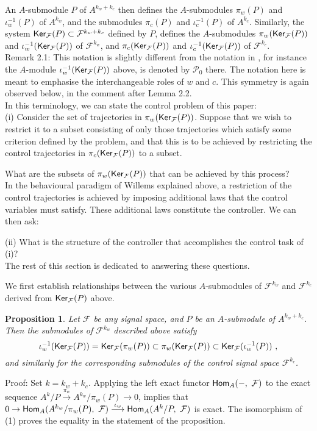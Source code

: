 \documentclass[11pt]{amsart}
\newtheorem{proposition}{Proposition}[section]
\def\homo{\mathop{\sf Hom}}
\def\ker{\mathop{\sf Ker}}
\newcommand{\F}{\mathcal{F}}
\begin{document}
{An $A$-submodule $P$ of $A^{k_w+k_c}$ then defines the $A$-submodules $\pi_w(P)$ and $\iota^{-1}_w(P)$ of $A^{k_w}$, and the submodules $\pi_c(P)$ and $\iota^{-1}_c(P)$ of $A^{k_c}$. Similarly, the system $\ker_\F(P) \subset \F^{k_w+k_c}$ defined by $P$, defines the $A$-submodules $\pi_w(\ker_\F(P))$ and $\iota^{-1}_w(\ker_\F(P))$ of $\F^{k_w}$, and $\pi_c(\ker_\F(P))$ and $\iota^{-1}_c(\ker_\F(P))$ of $\F^{k_c}$. \\

\noindent Remark 2.1: This notation is slightly different from the notation in \cite{sc}, for instance the $A$-module $\iota^{-1}_w(\ker_\F(P))$ above, is denoted by $\mathcal{P}_0$ there. The notation here is meant to emphasise the interchangeable roles of $w$ and $c$. This symmetry is again observed below, in the comment after Lemma 2.2.\\


In this terminology, we can state the control problem of this paper: \\
(i) Consider the set of trajectories in $\pi_w(\ker_\F(P))$. Suppose that we wish to restrict it to a subset consisting of only those trajectories which satisfy some criterion defined by the problem, and that this is to be achieved by restricting the control trajectories in $\pi_c(\ker_\F(P))$ to a subset.

\vspace{1.5mm}
What are the subsets of $\pi_w(\ker_\F(P))$ that can be achieved by this process? \\

In the behavioural paradigm of Willems explained above, a restriction of the control trajectories is  achieved by imposing additional laws that the control variables must satisfy. These additional laws constitute the controller. We can then ask:
\vspace{1.5mm}

(ii) What is the structure of the controller that accomplishes the control task of (i)? \\

The rest of this section is dedicated to answering these questions. 
\vspace{1.5mm}

We first establish relationships between the various $A$-submodules of $\F^{k_w}$ and $\F^{k_c}$ derived from $\ker_\F(P)$ above.

\begin{proposition} Let $\F$ be any signal space, and $P$ be an $A$-submodule of  $A^{k_w+k_c}$. Then the submodules of $\F^{k_w}$ described above satisfy
\[ 
\iota_w^{-1}({\ker}_\F(P)) = {\ker}_\F(\pi_w(P)) \subset \pi_w({\ker}_\F(P)) \subset {\ker}_\F(\iota_w^{-1}(P)) ~, \] 
and similarly for the corresponding submodules of the control signal space $\F^{k_c}$.
\end{proposition}
\noindent Proof: Set $k = k_w + k_c$. Applying the left exact functor $\homo_A( -, ~\F)$ to the exact sequence $A^k/P \stackrel{\pi_w}{\longrightarrow} A^{k_w}/\pi_w(P) \rightarrow 0$, implies that   $0 \rightarrow \homo_A(A^{k_w}/\pi_w(P), ~\F) \stackrel{\iota_w}{\longrightarrow} \homo_A(A^k/P, ~\F)$ is exact. The isomorphism of (1) proves the equality in the statement of the proposition. 

}
\end{document}
